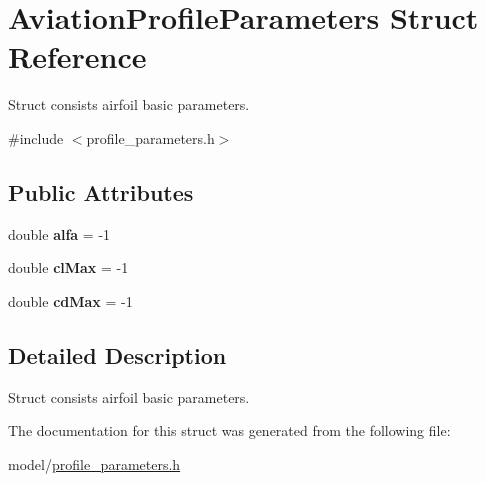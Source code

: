\hypertarget{struct_aviation_profile_parameters}{}\section{Aviation\+Profile\+Parameters Struct Reference}
\label{struct_aviation_profile_parameters}


Struct consists airfoil basic parameters.  




{\ttfamily \#include $<$profile\+\_\+parameters.\+h$>$}

\subsection*{Public Attributes}
\begin{DoxyCompactItemize}
\item 
\hypertarget{struct_aviation_profile_parameters_a193e4e8fe42f26ed6352fdf7cb438f7c}{}\label{struct_aviation_profile_parameters_a193e4e8fe42f26ed6352fdf7cb438f7c} 
double {\bfseries alfa} = -\/1
\item 
\hypertarget{struct_aviation_profile_parameters_a5aa0cd7099bde735f7fe27020ec9c508}{}\label{struct_aviation_profile_parameters_a5aa0cd7099bde735f7fe27020ec9c508} 
double {\bfseries cl\+Max} = -\/1
\item 
\hypertarget{struct_aviation_profile_parameters_a03ebf56b9d8cb5ec9923108289e09632}{}\label{struct_aviation_profile_parameters_a03ebf56b9d8cb5ec9923108289e09632} 
double {\bfseries cd\+Max} = -\/1
\end{DoxyCompactItemize}


\subsection{Detailed Description}
Struct consists airfoil basic parameters. 

The documentation for this struct was generated from the following file\+:\begin{DoxyCompactItemize}
\item 
model/\hyperlink{profile__parameters_8h}{profile\+\_\+parameters.\+h}\end{DoxyCompactItemize}

